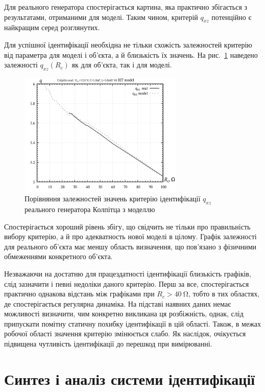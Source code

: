 Для реального генератора спостерігається картина, яка практично
збігається з результатами, отриманими для моделі. Таким чином,
критерій $q_{xz}$ потенційно є найкращим серед розглянутих.

Для успішної ідентифікації необхідна не тільки схожість
залежностей критерію від параметра для моделі і об'єкта, а й
близькість їх значень. На рис.~\ref{atu:f:colp_q_cml} наведено залежності
$ q_{xz} (R_c) $ як для об'єкта, так і для моделі.

\begin{figure}[htb!]
\centerline{\includegraphics[width=0.7\textwidth]{p/colp_q_cml.png} }
\caption{Порівняння залежностей значень критерію ідентифікації $ q_{xz} $ реального генератора Колпітца з моделлю}
\label{atu:f:colp_q_cml}
\end{figure}

Спостерігається хороший рівень збігу, що свідчить не тільки
про правильність вибору критерію, а й про адекватность нової
моделі в цілому. Графік залежності для реального об'єкта має
меншу область визначення, що пов'язано з фізичними обмеженнями
конкретного об'єкта.

Незважаючи на достатню для працездатності ідентифікації
близькість графіків, слід зазначити і певні недоліки даного
критерію. Перш за все, спостерігається практично однакова
відстань між графіками при
$ R_c> \SI{40}{\ohm} $, тобто в тих областях, де спостерігається регулярна
динаміка. На підставі наявних даних немає можливості визначити,
чим конкретно викликана ця розбіжність, однак, слід припускати
помітну статичну похибку ідентифікації в цій області. Також, в
межах робочої області значення критерію змінюється слабо. Як
наслідок, очікується підвищена чутливість ідентифікації до
перешкод при вимірюванні.


\section{Синтез і аналіз системи ідентифікації} %


